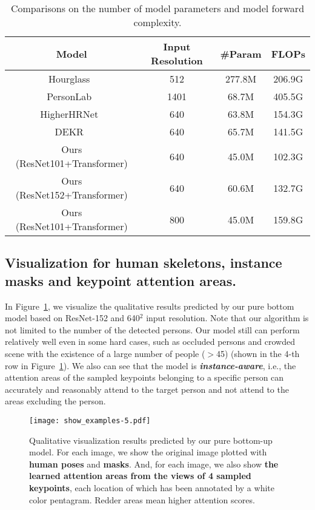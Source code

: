 \documentclass{article} \usepackage{iclr_conference,times}
\begin{document}
\begin{table}[h]
	\centering
	\begin{tabular}{cccc}
		\toprule
		Model & Input Resolution & \#Param & FLOPs\\
		\midrule
	    Hourglass~\citep{ae:newell2016associative} & 512 & 277.8M & 206.9G \\
	    
	    PersonLab~\citep{personlab:papandreou2018personlab} & 1401 & 68.7M & 405.5G \\
	    
	    HigherHRNet~\citep{higherhrnet:cheng2020higherhrnet} & 640 & 63.8M & 154.3G \\
	    
	    DEKR~\citep{dekr:geng2021bottom} & 640 & 65.7M	& 141.5G \\
	    \midrule
	    
	    Ours (ResNet101+Transformer) & 640 & 45.0M & 102.3G \\
	    
	    Ours (ResNet152+Transformer) & 640 & 60.6M & 132.7G \\
	    Ours (ResNet101+Transformer) & 800 & 45.0M & 159.8G \\
		\bottomrule
	\end{tabular}
	\caption{Comparisons on the number of model parameters and model forward complexity.}
	\label{tab:params_flops}
\end{table}

\subsection{Visualization for human skeletons, instance masks and keypoint attention areas.}
\label{appendix:vis}
In Figure~\ref{fig:vis}, we visualize the qualitative results predicted by our pure bottom model based on ResNet-152 and 640$^2$ input resolution. Note that our algorithm is not limited to the number of the detected persons. Our model still can perform relatively well even in some hard cases, such as occluded persons and crowded scene with the existence of a large number of people ($>$45) (shown in the 4-th row in Figure~\ref{fig:vis}). We also can see that the model is \textit{\textbf{instance-aware}}, i.e., the attention areas of the sampled keypoints belonging to a specific person can accurately and reasonably attend to the target person and not attend to the areas excluding the person.


\begin{figure}
\begin{center}
\texttt{[image: show\_examples-5.pdf]}
\end{center}
\caption{Qualitative visualization results predicted by our pure bottom-up model. For each image, we show the original image plotted with \textbf{human poses} and \textbf{masks}. And, for each image, we also show \textbf{the learned attention areas from the views of 4 sampled keypoints}, each location of which has been annotated by a white color pentagram. Redder areas mean higher attention scores.}
\label{fig:vis} \end{figure}
\end{document}

